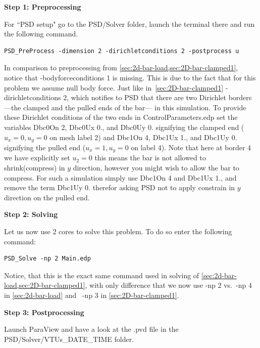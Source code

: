 \textbf{Step 1: Preprocessing}

For ``PSD setup" go to the {\ttfamily PSD/Solver} folder, launch the terminal there and run the following command.
\begin{lstlisting}[style=Linux]
PSD_PreProcess -dimension 2 -dirichletconditions 2 -postprocess u
\end{lstlisting}
%
In comparison to preprocessing from \cref{sec:2d-bar-load,sec:2D-bar-clamped1}, notice that {\ttfamily -bodyforceconditions 1} is missing. This is due to the fact that for this problem we assume null body force. Just like in~\cref{sec:2D-bar-clamped1} {\ttfamily -dirichletconditions 2}, which notifies to PSD that there are two Dirichlet borders ---the clamped and the pulled ends of the bar--- in this simulation.
To provide these Dirichlet conditions of the two ends in {\ttfamily ControlParameters.edp} set the variables  {\ttfamily Dbc0On 2}, {\ttfamily Dbc0Ux 0.}, and {\ttfamily Dbc0Uy 0.} signifying the clamped end ($u_x=0,u_y=0$ on mesh label 2) and {\ttfamily Dbc1On 4}, {\ttfamily Dbc1Ux 1.}, and {\ttfamily Dbc1Uy 0.} signifying the pulled end ($u_x=1,u_y=0$  on label 4). Note that here at border 4 we have explicitly set $u_2=0$ this means the bar is not allowed to shrink(compress) in $y$ direction, however you might wish to allow the bar to compress. For such a simulation simply use {\ttfamily Dbc1On 4} and {\ttfamily Dbc1Ux 1.}, and remove the term {\ttfamily Dbc1Uy 0.} therefor asking PSD not to apply constrain in $y$ direction on the pulled end.

\textbf{Step 2: Solving}

Let us now use 2 cores to solve this problem. To do so enter the following command:

\begin{lstlisting}[style=Linux]
PSD_Solve -np 2 Main.edp
\end{lstlisting}
%
Notice, that this is the exact same command used in solving of \cref{sec:2d-bar-load,sec:2D-bar-clamped1}, with only difference that we now use {\ttfamily -np 2} vs.~{\ttfamily -np 4} in \cref{sec:2d-bar-load} and ~{\ttfamily -np 3} in \cref{sec:2D-bar-clamped1}.


\textbf{Step 3: Postprocessing}

Launch ParaView and have a look at the  {\ttfamily .pvd} file in the  {\ttfamily PSD/Solver/VTUs\_DATE\_TIME} folder. 

